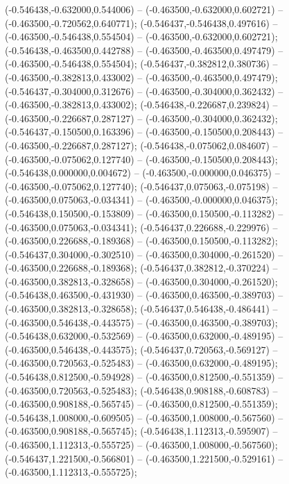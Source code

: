  (-0.546438,-0.632000,0.544006) -- (-0.463500,-0.632000,0.602721) -- (-0.463500,-0.720562,0.640771);
 (-0.546437,-0.546438,0.497616) -- (-0.463500,-0.546438,0.554504) -- (-0.463500,-0.632000,0.602721);
 (-0.546438,-0.463500,0.442788) -- (-0.463500,-0.463500,0.497479) -- (-0.463500,-0.546438,0.554504);
 (-0.546437,-0.382812,0.380736) -- (-0.463500,-0.382813,0.433002) -- (-0.463500,-0.463500,0.497479);
 (-0.546437,-0.304000,0.312676) -- (-0.463500,-0.304000,0.362432) -- (-0.463500,-0.382813,0.433002);
 (-0.546438,-0.226687,0.239824) -- (-0.463500,-0.226687,0.287127) -- (-0.463500,-0.304000,0.362432);
 (-0.546437,-0.150500,0.163396) -- (-0.463500,-0.150500,0.208443) -- (-0.463500,-0.226687,0.287127);
 (-0.546438,-0.075062,0.084607) -- (-0.463500,-0.075062,0.127740) -- (-0.463500,-0.150500,0.208443);
 (-0.546438,0.000000,0.004672) -- (-0.463500,-0.000000,0.046375) -- (-0.463500,-0.075062,0.127740);
 (-0.546437,0.075063,-0.075198) -- (-0.463500,0.075063,-0.034341) -- (-0.463500,-0.000000,0.046375);
 (-0.546438,0.150500,-0.153809) -- (-0.463500,0.150500,-0.113282) -- (-0.463500,0.075063,-0.034341);
 (-0.546437,0.226688,-0.229976) -- (-0.463500,0.226688,-0.189368) -- (-0.463500,0.150500,-0.113282);
 (-0.546437,0.304000,-0.302510) -- (-0.463500,0.304000,-0.261520) -- (-0.463500,0.226688,-0.189368);
 (-0.546437,0.382812,-0.370224) -- (-0.463500,0.382813,-0.328658) -- (-0.463500,0.304000,-0.261520);
 (-0.546438,0.463500,-0.431930) -- (-0.463500,0.463500,-0.389703) -- (-0.463500,0.382813,-0.328658);
 (-0.546437,0.546438,-0.486441) -- (-0.463500,0.546438,-0.443575) -- (-0.463500,0.463500,-0.389703);
 (-0.546438,0.632000,-0.532569) -- (-0.463500,0.632000,-0.489195) -- (-0.463500,0.546438,-0.443575);
 (-0.546437,0.720563,-0.569127) -- (-0.463500,0.720563,-0.525483) -- (-0.463500,0.632000,-0.489195);
 (-0.546438,0.812500,-0.594928) -- (-0.463500,0.812500,-0.551359) -- (-0.463500,0.720563,-0.525483);
 (-0.546438,0.908188,-0.608783) -- (-0.463500,0.908188,-0.565745) -- (-0.463500,0.812500,-0.551359);
 (-0.546438,1.008000,-0.609505) -- (-0.463500,1.008000,-0.567560) -- (-0.463500,0.908188,-0.565745);
 (-0.546438,1.112313,-0.595907) -- (-0.463500,1.112313,-0.555725) -- (-0.463500,1.008000,-0.567560);
 (-0.546437,1.221500,-0.566801) -- (-0.463500,1.221500,-0.529161) -- (-0.463500,1.112313,-0.555725);
